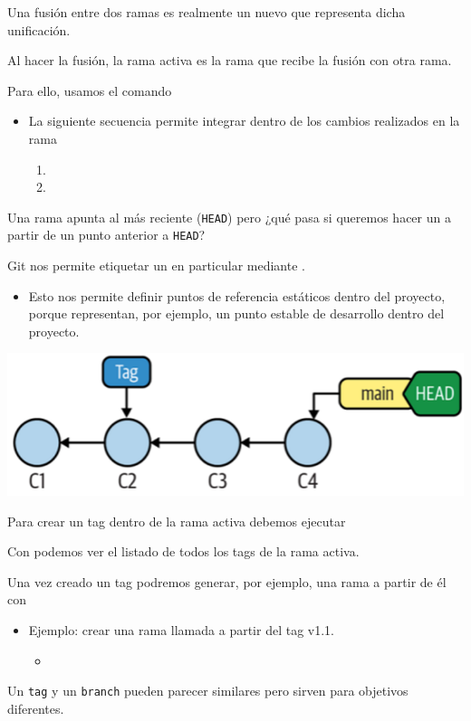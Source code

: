 Una fusión entre dos ramas es realmente un nuevo  que representa dicha unificación.

Al hacer la fusión, la rama activa es la rama que recibe la fusión con otra rama.

Para ello, usamos el comando 

\begin{itemize}
	\item La siguiente secuencia permite integrar dentro de  los cambios realizados en la rama 
\begin{enumerate}[label=\arabic*)]
\item {}
\item {}
\end{enumerate}
\end{itemize}
Una rama apunta al  más reciente (\texttt{HEAD}) pero ¿qué pasa si queremos hacer un  a partir de un punto anterior a \texttt{HEAD}?

Git nos permite etiquetar un  en particular mediante .

\begin{itemize}
	\item Esto nos permite definir puntos de referencia estáticos dentro del proyecto, porque representan, por ejemplo, un punto estable de desarrollo dentro del proyecto.
\end{itemize}
\begin{center}
	\includegraphics{"Temas/Tema 1/screenshot012"}
\end{center}
Para crear un tag dentro de la rama activa debemos ejecutar 

Con  podemos ver el listado de todos los tags de la rama activa.

Una vez creado un tag podremos generar, por ejemplo, una rama a partir de él con 
\begin{itemize}
	\item Ejemplo: crear una rama llamada  a partir del tag v1.1.
	\begin{itemize}
		\item {}
	\end{itemize}
\end{itemize}
Un \texttt{tag} y un \texttt{branch} pueden parecer similares pero sirven para objetivos diferentes.


